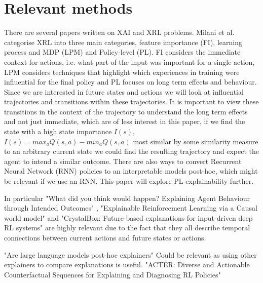 \documentclass[UKenglish]{uiomasterthesis}
\begin{document}
\section{Relevant methods}
There are several papers written on XAI and XRL problems. Milani et al.\cite{milani2022survey} categorise XRL into three main categories, feature importance (FI), learning process and MDP (LPM) and Policy-level (PL). FI considers the immediate context for actions, i.e. what part of the input was important for a single action, LPM considers techniques that highlight which experiences in training were influential for the final policy and PL focuses on long term effects and behaviour. Since we are interested in future states and actions we will look at influential trajectories and transitions within these trajectories. It is important to view these transitions in the context of the trajectory to understand the long term effects and not just immediate, which are of less interest in this paper, if we find the state with a high state importance $I(s)$, $I(s) = max_aQ(s,a)-min_aQ(s,a)$ most similar by some similarity measure to an arbitrary current state we could find the resulting trajectory and expect the agent to intend a similar outcome. There are also ways to convert Recurrent Neural Network (RNN) policies to an interpretable models post-hoc, which might be relevant if we use an RNN. This paper will explore PL explainability further.

In particular "What did you think would happen? Explaining Agent Behaviour through Intended Outcomes" \cite{yau2020did}, "Explainable Reinforcement Learning via a Causal world model" \cite{yu2024explainable} and "CrystalBox: Future-based explanations for input-driven deep RL systems" \cite{patel2024crystalbox} are highly relevant due to the fact that they all describe temporal connections between current actions and future states or actions.

"Are large language models post-hoc explainers" \cite{kroeger2024large} Could be relevant as using other explainers to compare explanations is useful. "ACTER: Diverse and Actionable Counterfactual Sequences for Explaining and Diagnosing RL Policies" \cite{gajcin2024acter} 
\end{document}
